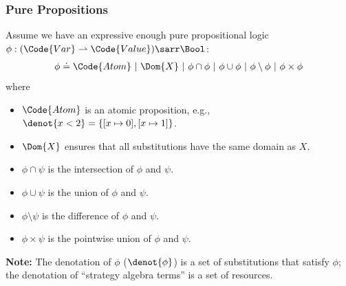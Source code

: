 \begin{frame}[fragile]
    \frametitle{Pure Propositions}

Assume we have an expressive enough pure propositional logic $\phi: (\Code{Var} \rightharpoonup \Code{Value}) \sarr \Bool$:
\begin{align*}
\phi \doteq \Code{Atom} ~|~ \Dom{X} ~|~ \phi \cap \phi ~|~ \phi \cup \phi ~|~ \phi \setminus \phi ~|~ \phi \times \phi
\end{align*}
where
\begin{itemize}
    \item $\Code{Atom}$ is an atomic proposition, e.g., $\denot{x < 2} = \{[x\mapsto 0], [x\mapsto 1]\}$.
    \item $\Dom{X}$ ensures that all substitutions have the same domain as $X$.
    \item $\phi \cap \psi$ is the intersection of $\phi$ and $\psi$.
    \item $\phi \cup \psi$ is the union of $\phi$ and $\psi$.
    \item $\phi \setminus \psi$ is the difference of $\phi$ and $\psi$.
    \item $\phi \times \psi$ is the pointwise union of $\phi$ and $\psi$.
\end{itemize}

\textbf{Note:} The denotation of $\phi$ ($\denot{\phi}$) is a set of substitutions that satisfy $\phi$; the denotation of ``strategy algebra terms'' is a set of resources.

\end{frame}

